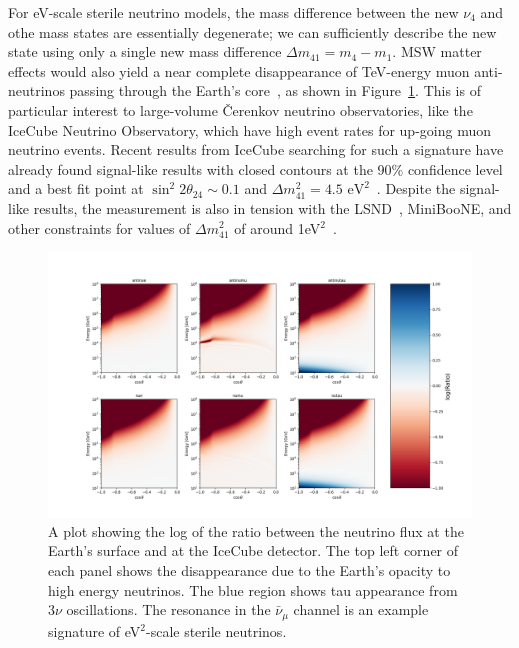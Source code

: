 \documentclass[main.tex]{subfiles}
\begin{document}
For eV-scale sterile neutrino models, the mass difference between the new $\nu_{4}$ and othe mass states are essentially degenerate; we can sufficiently describe the new state using only a single new mass difference $\Delta m_{41} = m_{4}-m_{1}$. 
MSW matter effects would also yield a near complete disappearance of TeV-energy muon anti-neutrinos passing through the Earth's core~\cite{Nunokawa:2003ep, Petcov:2016iiu, Choubey:2007ji, Barger:2011rc, Esmaili:2012nz, esmaili2013restricting, Lindner:2015iaa}, as shown in Figure~\ref{fig:sterile_osc_sig}.
This is of particular interest to large-volume \v{C}erenkov neutrino observatories, like the IceCube Neutrino Observatory, which have high event rates for up-going muon neutrino events. 
Recent results from IceCube searching for such a signature have already found signal-like results with closed contours at the 90\% confidence level and a best fit point at $\sin^2 2\theta_{24}\sim0.1$ and $\Delta m^2_{41}=4.5\text{ eV}^2$~\cite{Aartsen_2020, Aartsen_2020_prd}. 
Despite the signal-like results, the measurement is also in tension with the LSND~\cite{Athanassopoulos_1998}, MiniBooNE, and other constraints for values of $\Delta m_{41}^{2}$ of around 1eV$^{2}$~\cite{kopp2013sterile, Cirelli:2004cz, abazajian2012light, Gariazzo:2017fdh, Dentler:2017tkw, Diaz:2019fwt}.

\begin{figure}
    \centering
    \includegraphics[width=0.8\linewidth]{figures/sterile_flux_plot.png}
    \caption{A plot showing the log of the ratio between the neutrino flux at the Earth's surface and at the IceCube detector. The top left corner of each panel shows the disappearance due to the Earth's opacity to high energy neutrinos. The blue region shows tau appearance from $3\nu$ oscillations. The resonance in the $\bar{\nu}_{\mu}$ channel is an example signature of eV$^{2}$-scale sterile neutrinos.}\label{fig:sterile_osc_sig}
\end{figure}
\end{document}
